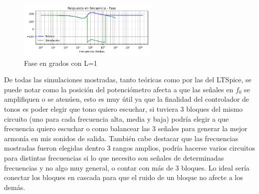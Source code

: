\begin{figure}[H]
	\centering
	\includegraphics[width=0.6\textwidth]{../Ejercicio4-EcualizadorDeFase/Informe/highFrecL100Fase.png} 
	\caption{Fase en grados con L=1}
	\label{highFaseL10}
\end{figure}


De todas las simulaciones mostradas, tanto teóricas como por las del LTSpice, se puede notar como la posición del potenciómetro afecta a que las señales en $f_0$ se amplifiquen o se atenúen, esto es muy útil ya que la finalidad del controlador de tonos es poder elegir que tono quiero escuchar, si tuviera 3 bloques del mismo circuito (uno para cada frecuencia alta, media y baja) podría elegir a que frecuencia quiero escuchar o como balancear las 3 señales para generar la mejor armonía en mis sonidos de salida. 
También cabe destacar que las frecuencias mostradas fueron elegidas dentro 3 rangos amplios, podría hacerse varios circuitos para distintas frecuencias si lo que necesito son señales de determinadas frecuencias y no algo muy general, o contar con más de 3 bloques. Lo ideal sería conectar los bloques en cascada para que el ruido de un bloque no afecte a los demás.




